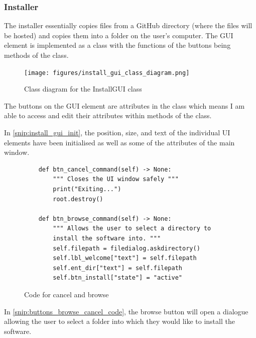 \documentclass[11pt]{article}
\begin{document}
            \subsubsection{Installer}
                The installer essentially copies files from a GitHub directory (where the files will be hosted) and copies them into a folder on the user's computer. The GUI element is implemented as a class with the functions of the buttons being methods of the class. 
                \pagebreak
                \begin{figure}[!ht]
                   \begin{center}
                       \texttt{[image: figures/install\_gui\_class\_diagram.png]}
                   \end{center}
                   \caption{Class diagram for the InstallGUI class}
                   \label{fig:install_gui_class_diag}
                \end{figure}

                The buttons on the GUI element are attributes in the class which means I am able to access and edit their attributes within methods of the class. 

                In \autoref{snip:install_gui_init}, the position, size, and text of the individual UI elements have been initialised as well as some of the attributes of the main window.

\begin{figure}[!ht]
   \begin{verbatim}
    def btn_cancel_command(self) -> None:
        """ Closes the UI window safely """
        print("Exiting...")
        root.destroy()

    def btn_browse_command(self) -> None:
        """ Allows the user to select a directory to 
        install the software into. """
        self.filepath = filedialog.askdirectory()
        self.lbl_welcome["text"] = self.filepath
        self.ent_dir["text"] = self.filepath
        self.btn_install["state"] = "active"
   \end{verbatim}
   \caption{Code for cancel and browse}
   \label{snip:buttons_browse_cancel_code}
\end{figure}

                In \autoref{snip:buttons_browse_cancel_code}, the browse button will open a dialogue allowing the user to select a folder into which they would like to install the software.
\end{document}
